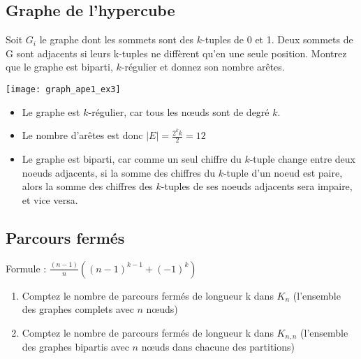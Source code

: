 \subsection{Graphe de l'hypercube}
Soit $G_{i}$ le graphe dont les sommets sont des $k$-tuples de 0 et 1.
Deux sommets de G sont adjacents si leurs k-tuples ne diffèrent qu'en une seule position.
Montrez que le graphe est biparti, $k$-régulier et donnez son nombre arêtes.

\begin{solution}
  \begin{minipage}{0.35\textwidth}
    \begin{flushleft}
      \texttt{[image: graph\_ape1\_ex3]}
    \end{flushleft}
  \end{minipage}
  \begin{minipage}{0.65\textwidth}
    \begin{flushright}
      \begin{itemize}
        \item Le graphe est $k$-régulier, car tous les nœuds sont de degré $k$.
        \item Le nombre d'arêtes est donc $|E| = \frac{2^{k} k}{2} = 12$
        \item Le graphe est biparti, car comme un seul chiffre du $k$-tuple change entre deux noeuds adjacents,
          si la somme des chiffres du $k$-tuple d'un noeud est paire, alors la somme des chiffres des $k$-tuples de ses noeuds adjacents sera impaire, et vice versa.
      \end{itemize}
    \end{flushright}
  \end{minipage}
\end{solution}

\subsection{Parcours fermés}
Formule : $\frac{(n-1)}{n}((n-1)^{k-1}+(-1)^{k})$
\begin{enumerate}
\item{Comptez le nombre de parcours fermés de longueur k dans $K_{n}$ (l’ensemble des graphes complets avec $n$ nœuds)}
\item{Comptez le nombre de parcours fermés de longueur k dans $K_{n,n}$ (l’ensemble des graphes bipartis avec $n$ nœuds dans chacune des partitions)}
\end{enumerate}

